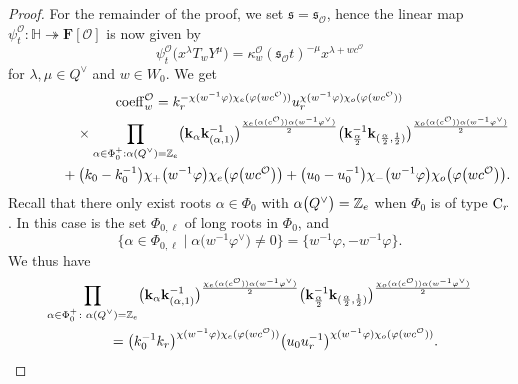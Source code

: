 \documentclass[pdftex]{sigma}
\numberwithin{equation}{section}
\begin{document}
\begin{proof}
For the remainder of the proof, we set $\mathfrak{s}=\mathfrak{s}_\mathcal{O}$, hence the linear map $\psi_t^\mathcal{O}\colon \mathbb{H}\twoheadrightarrow\mathbf{F}[\mathcal{O}]$ is now given by
\begin{equation}\label{psitO}
\psi_t^\mathcal{O}\bigl(x^\lambda T_wY^\mu\bigr)=\kappa_w^\mathcal{O}(\mathfrak{s}_\mathcal{O}t)^{-\mu}x^{\lambda+wc^\mathcal{O}}
\end{equation}
for $\lambda,\mu\in Q^\vee$ and $w\in W_0$.
We get
\begin{gather}
{\rm coeff}_w^\mathcal{O}=k_r^{-\chi(w^{-1}\varphi)\chi_e(\varphi(wc^\mathcal{O}))}
u_r^{\chi(w^{-1}\varphi)\chi_o(\varphi(wc^\mathcal{O}))}\nonumber\\
\hphantom{{\rm coeff}_w^\mathcal{O}=}\quad{}
 \times\prod_{\alpha\in\Phi_0^+: \alpha\smash{(Q^\vee)}=\mathbb{Z}_e}
\bigl(\mathbf{k}_\alpha \mathbf{k}_{(\alpha,1)}^{-1}\bigr)^{\frac{\chi_e(\alpha(c^\mathcal{O}))\alpha(w^{-1}\varphi^\vee)}{2}} \bigl(\mathbf{k}_{\frac{\alpha}{2}}^{-1}\mathbf{k}_{(\frac{\alpha}{2},\frac{1}{2})}\bigr)^{\frac{\chi_o(\alpha(c^\mathcal{O}))\alpha(w^{-1}\varphi^\vee)}{2}}\nonumber\\
\hphantom{{\rm coeff}_w^\mathcal{O}=}{}
+\bigl(k_0-k_0^{-1}\bigr)\chi_+\bigl(w^{-1}\varphi\bigr)\chi_e\bigl(\varphi\bigl(wc^\mathcal{O}\bigr)\bigr)+
\bigl(u_0-u_0^{-1}\bigr)\chi_-\bigl(w^{-1}\varphi\bigr)\chi_o\bigl(\varphi\bigl(wc^\mathcal{O}\bigr)\bigr).
\label{coeffmid}
\end{gather}
Recall that there only exist roots $\alpha\in\Phi_0$ with $\alpha\smash{\bigl(Q^\vee\bigr)}=\mathbb{Z}_e$ when $\Phi_0$ is of type ${\rm C}_r$. In this case
 is the set $\Phi_{0,\ell}$ of long roots in $\Phi_0$, and
\[
\bigl\{\alpha\in\Phi_{0,\ell} \mid \alpha\bigl(w^{-1}\varphi^\vee\bigr)\not=0\bigr\}=\big\{w^{-1}\varphi,-w^{-1}\varphi\big\}.
\]
We thus have
\begin{gather*}
\prod_{\alpha\in\Phi_0^+\colon \alpha\smash{(Q^\vee)}=\mathbb{Z}_e}
\bigl(\mathbf{k}_\alpha \mathbf{k}_{(\alpha,1)}^{-1}\bigr)^{\frac{\chi_e(\alpha(c^\mathcal{O}))\alpha(w^{-1}\varphi^\vee)}{2}} \bigl(\mathbf{k}_{\frac{\alpha}{2}}^{-1}\mathbf{k}_{(\frac{\alpha}{2},\frac{1}{2})}\bigr)^{\frac{\chi_o(\alpha(c^\mathcal{O}))\alpha(w^{-1}\varphi^\vee)}{2}}\\
\qquad{}=
\bigl(k_0^{-1}k_r\bigr)^{\chi(w^{-1}\varphi)\chi_e(\varphi(wc^\mathcal{O}))}
\bigl(u_0u_r^{-1}\bigr)^{\chi(w^{-1}\varphi)\chi_o(\varphi(wc^\mathcal{O}))}.\label{hhhelp}

\end{gather*}
\end{proof}
\end{document}
